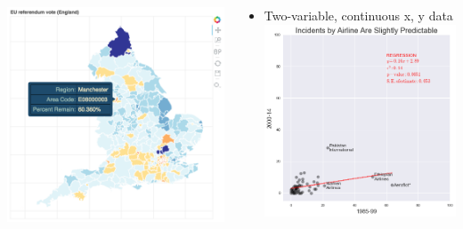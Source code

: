 \begin{frame}
\begin{scriptsize}
\begin{columns}[T]
\begin{column}{5.5cm}
\begin{itemize}
          \includegraphics[height=0.15\textheight]{images/ex5}          
      \end{itemize}  
    \end{column}
    \begin{column}{5.5cm}  
      \begin{itemize}
        \item Two-variable, continuous x, y data\\
          \includegraphics[height=0.15\textheight]{images/ex2}

\end{itemize}
\end{column}
\end{columns}
\end{scriptsize}
\end{frame}
